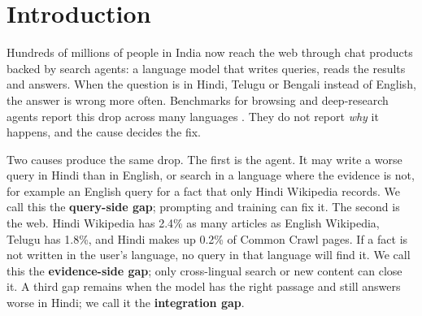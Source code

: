 \begin{abstract}
A search agent answers a Hindi or Telugu question less accurately than the same question in English. The cause may be the agent's queries (the \emph{query-side gap}) or missing evidence in the user's language (the \emph{evidence-side gap}), and each needs a different fix. We separate them with human-parallel Hindi/English and Telugu/English questions whose answer is in both Wikipedias (287 Hindi, 127 Telugu), a frozen pool of 1.9 million Wikipedia passages served as English-only, Indic-only or both, and a logged, then forced, query language. Four models (three Gemini, one open-weight Qwen3) run the grid under a dense cross-lingual retriever and under BM25. With dense retrieval, the cheapest models lose 9 points on Hindi questions and the stronger Gemini models lose 2--3 (not significant). Changing the query language or pool recovers almost nothing, and with the gold passage in the prompt Hindi is still 4--6 points worse: the residual gap is reading. Under BM25 the Hindi gap is 19--20 points, and dual-language queries recover 9--14. The Hindi and Telugu Wikipedias hold the answer for only 29\% and 24\% of questions; on the uncovered questions a Hindi user reaches 51\% against 60\% for an English user.
\end{abstract}

\section{Introduction}
\label{sec:intro}


Hundreds of millions of people in India now reach the web through chat products backed by search agents: a language model that writes queries, reads the results and answers. When the question is in Hindi, Telugu or Bengali instead of English, the answer is wrong more often. Benchmarks for browsing and deep-research agents report this drop across many languages \citep{a2505_15935,a2608_08775,a2606_15345,a2610_03574}. They do not report \emph{why} it happens, and the cause decides the fix.

Two causes produce the same drop. The first is the agent. It may write a worse query in Hindi than in English, or search in a language where the evidence is not, for example an English query for a fact that only Hindi Wikipedia records. We call this the \textbf{query-side gap}; prompting and training can fix it. The second is the web. Hindi Wikipedia has 2.4\% as many articles as English Wikipedia, Telugu has 1.8\%, and Hindi makes up 0.2\% of Common Crawl pages. If a fact is not written in the user's language, no query in that language will find it. We call this the \textbf{evidence-side gap}; only cross-lingual search or new content can close it. A third gap remains when the model has the right passage and still answers worse in Hindi; we call it the \textbf{integration gap}.

